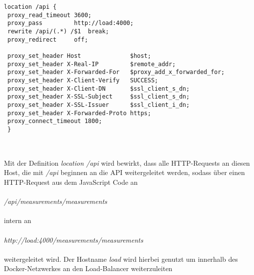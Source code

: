 \begin{lstlisting}[language={}, caption={Frontend Nginx Konfiguration}, captionpos=b, label={fig:Frontend Nginx}]
location /api {
 proxy_read_timeout 3600;
 proxy_pass         http://load:4000;
 rewrite /api/(.*) /$1  break;
 proxy_redirect     off;

 proxy_set_header Host              $host;
 proxy_set_header X-Real-IP         $remote_addr;
 proxy_set_header X-Forwarded-For   $proxy_add_x_forwarded_for;
 proxy_set_header X-Client-Verify   SUCCESS;
 proxy_set_header X-Client-DN       $ssl_client_s_dn;
 proxy_set_header X-SSL-Subject     $ssl_client_s_dn;
 proxy_set_header X-SSL-Issuer      $ssl_client_i_dn;
 proxy_set_header X-Forwarded-Proto https;
 proxy_connect_timeout 1800;
 }
    
\end{lstlisting}~\\
Mit der Definition \textit{location /api} wird bewirkt, dass alle HTTP-Requests an diesen Host, die mit \textit{/api} beginnen 
an die API weitergeleitet werden, sodass über einen HTTP-Request aus dem JavaScript \cite{javascript} Code an \\\\
\textit{/api/measurements/measurements}\\\\ 
intern an \\\\
\textit{http://load:4000/measurements/measurements}\\\\
 weitergeleitet wird. Der Hostname \textit{load} wird hierbei genutzt um innerhalb des Docker-Netzwerkes an den Load-Balancer weiterzuleiten